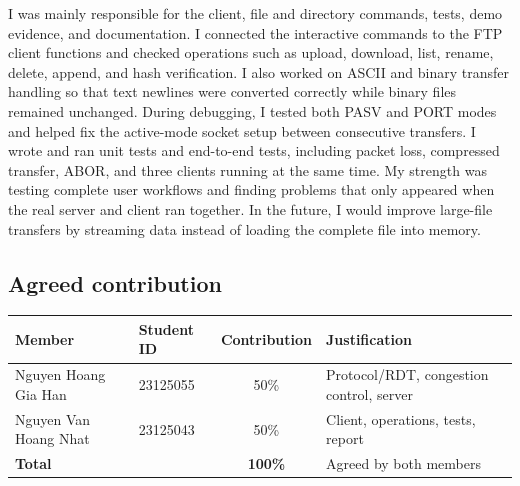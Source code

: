 I was mainly responsible for the client, file and directory commands, tests,
demo evidence, and documentation. I connected the interactive commands to
the FTP client functions and checked operations such as upload, download,
list, rename, delete, append, and hash verification. I also worked on ASCII
and binary transfer handling so that text newlines were converted correctly
while binary files remained unchanged. During debugging, I tested both PASV
and PORT modes and helped fix the active-mode socket setup between
consecutive transfers. I wrote and ran unit tests and end-to-end tests,
including packet loss, compressed transfer, ABOR, and three clients running
at the same time. My strength was testing complete user workflows and finding
problems that only appeared when the real server and client ran together. In
the future, I would improve large-file transfers by streaming data instead
of loading the complete file into memory.

\subsection{Agreed contribution}

\begin{tabularx}{\textwidth}{l l c X }
\toprule
Member & Student ID & Contribution & Justification\\
\midrule
Nguyen Hoang Gia Han & 23125055 & 50\% & Protocol/RDT, congestion control, server \\
Nguyen Van Hoang Nhat & 23125043 & 50\% & Client, operations, tests, report \\
\textbf{Total} & & \textbf{100\%} & Agreed by both members &\\
\bottomrule
\end{tabularx}